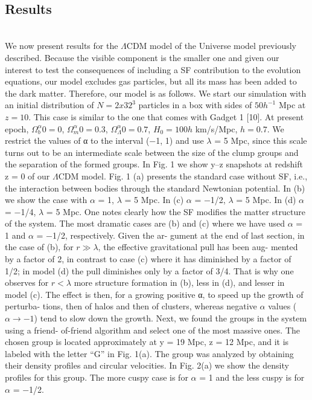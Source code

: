 \documentclass[10pt,twocolumn]{article}
\begin{document}
\\
\begin{center}
\section{Results}
\end{center}
\\
We now present results for the $\Lambda$CDM model of the Universe model previously described. Because the visible component is the smaller one and given our interest to test the consequences of including a SF contribution to the evolution equations, our model excludes gas particles, but all its mass has been added to the dark matter. Therefore, our model is as follows. We start our simulation with an initial distribution of $N=2 x 32^{3}$ particles in a box with sides of $50h^{-1}$ Mpc at $z=10$. This case is similar to the one that comes with Gadget 1 [10]. At present epoch, $\Omega^\alpha_b0 = 0$, $\Omega^\alpha_m0=0.3$, $\Omega^\alpha_\Lambda0 = 0.7$, $H_{0} = 100h$ km/s/Mpc, $h = 0.7$. We restrict the values of α to the interval (−1, 1) and use $ \lambda$ = 5 Mpc, since this scale turns out to be an intermediate scale between the size of the clump groups and the separation of the formed groups.
In Fig. 1 we show y–z snapshots at redshift z = 0 of our $\Lambda$CDM model. Fig. 1 (a) presents the standard case without SF, i.e., the interaction between bodies through the standard Newtonian potential. In (b) we show the case with $\alpha$ = 1, $\lambda$ = 5 Mpc. In (c) $\alpha$ = −1/2, $\lambda$ = 5 Mpc. In (d) $\alpha$ = −1/4, $\lambda$ = 5 Mpc. One notes clearly how the SF modiﬁes the matter structure of the system.
The most dramatic cases are (b) and (c) where we have used $\alpha$ = 1 and $\alpha$ = −1/2, respectively. Given the ar- gument at the end of last section, in the case of (b), for $r \gg \lambda$, the eﬀective gravitational pull has been aug- mented by a factor of 2, in contrast to case (c) where it has diminished by a factor of 1/2; in model (d) the pull diminishes only by a factor of 3/4. That is why one observes for $r < \lambda$ more structure formation in (b), less in (d), and lesser in model (c). The eﬀect is then, for a growing positive α, to speed up the growth of perturba- tions, then of halos and then of clusters, whereas negative $\alpha$ values ($\alpha \rightarrow  −1$) tend to slow down the growth.
Next, we found the groups in the system using a friend- of-friend algorithm and select one of the most massive ones. The chosen group is located approximately at y = 19 Mpc, z = 12 Mpc, and it is labeled with the letter “G” in Fig. 1(a). The group was analyzed by obtaining their density proﬁles and circular velocities. In Fig. 2(a) we show the density proﬁles for this group. The more cuspy case is for $\alpha$ = 1 and the less cuspy is for $\alpha$ = −1/2.
\end{document}
